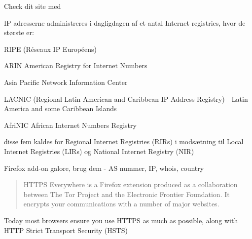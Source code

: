 \documentclass[Screen16to9,17pt]{foils}
\begin{document}
Check dit site med 


\begin{list1}
\item IP adresserne administreres i dagligdagen af et antal Internet
  registries, hvor de største er:
\begin{list2}
\item RIPE (Réseaux IP Européens)  
\item ARIN American Registry for Internet Numbers 
\item Asia Pacific Network Information Center 
\item LACNIC (Regional Latin-American and Caribbean IP Address
  Registry) - Latin America and some Caribbean Islands
\item AfriNIC African Internet Numbers Registry 
\end{list2}
\item disse fem kaldes for Regional Internet Registries (RIRs) i
  modsætning til Local Internet Registries (LIRs) og National Internet
  Registry (NIR)
\end{list1}

\vskip 1cm
\centerline{Firefox add-on galore, brug dem - AS nummer, IP, whois, country}




\begin{quote}
HTTPS Everywhere is a Firefox extension produced as a collaboration between The Tor Project and the Electronic Frontier Foundation. It encrypts your communications with a number of major websites.
\end{quote}

\centerline{}

Today most browsers ensure you use HTTPS as much as possible, along with HTTP Strict Transport Security (HSTS)



\centerline{}


\end{document}
